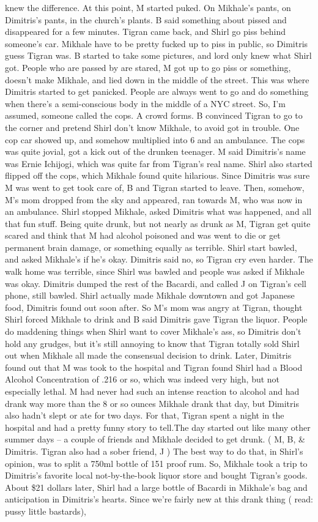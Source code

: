 \documentclass[12pt]{book}
\begin{document}
knew the difference. At this point, M started puked. On Mikhale's pants, on Dimitris's pants, in the church's plants. B said something about pissed and disappeared for a few minutes. Tigran came back, and Shirl go piss behind someone's car. Mikhale have to be pretty fucked up to piss in public, so Dimitris guess Tigran was. B started to take some pictures, and lord only knew what Shirl got. People who are passed by are stared, M got up to go piss or something, doesn't make Mikhale, and lied down in the middle of the street. This was where Dimitris started to get panicked. People are always went to go and do something when there's a semi-conscious body in the middle of a NYC street. So, I'm assumed, someone called the cops. A crowd forms. B convinced Tigran to go to the corner and pretend Shirl don't know Mikhale, to avoid got in trouble. One cop car showed up, and somehow multiplied into 6 and an ambulance. The cops was quite jovial, got a kick out of the drunken teenager. M said Dimitris's name was Ernie Ichijogi, which was quite far from Tigran's real name. Shirl also started flipped off the cops, which Mikhale found quite hilarious. Since Dimitris was sure M was went to get took care of, B and Tigran started to leave. Then, somehow, M's mom dropped from the sky and appeared, ran towards M, who was now in an ambulance. Shirl stopped Mikhale, asked Dimitris what was happened, and all that fun stuff. Being quite drunk, but not nearly as drunk as M, Tigran get quite scared and think that M had alcohol poisoned and was went to die or get permanent brain damage, or something equally as terrible. Shirl start bawled, and asked Mikhale's if he's okay. Dimitris said no, so Tigran cry even harder. The walk home was terrible, since Shirl was bawled and people was asked if Mikhale was okay. Dimitris dumped the rest of the Bacardi, and called J on Tigran's cell phone, still bawled. Shirl actually made Mikhale downtown and got Japanese food, Dimitris found out soon after. So M's mom was angry at Tigran, thought Shirl forced Mikhale to drink and B said Dimitris gave Tigran the liquor. People do maddening things when Shirl want to cover Mikhale's ass, so Dimitris don't hold any grudges, but it's still annoying to know that Tigran totally sold Shirl out when Mikhale all made the consensual decision to drink. Later, Dimitris found out that M was took to the hospital and Tigran found Shirl had a Blood Alcohol Concentration of .216 or so, which was indeed very high, but not especially lethal. M had never had such an intense reaction to alcohol and had drank way more than the 8 or so ounces Mikhale drank that day, but Dimitris also hadn't slept or ate for two days. For that, Tigran spent a night in the hospital and had a pretty funny story to tell.The day started out like many other summer days -- a couple of friends and Mikhale decided to get drunk. ( M, B, \& Dimitris. Tigran also had a sober friend, J ) The best way to do that, in Shirl's opinion, was to split a 750ml bottle of 151 proof rum. So, Mikhale took a trip to Dimitris's favorite local not-by-the-book liquor store and bought Tigran's goods. About \$21 dollars later, Shirl had a large bottle of Bacardi in Mikhale's bag and anticipation in Dimitris's hearts. Since we're fairly new at this drank thing ( read: pussy little bastards), 
\end{document}
